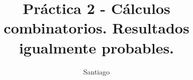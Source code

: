\documentclass{article}
\title{Práctica 2 - Cálculos combinatorios. Resultados igualmente probables.}
\author{Santiago}
\date{}
\begin{document}
    \maketitle
    \begin{enumerate}
        
    \end{enumerate}
\end{document}
